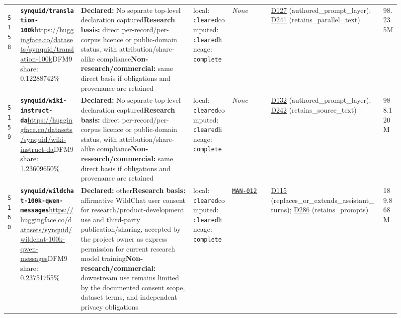\documentclass[9pt,a4paper]{article}
\newcommand{\srcid}[1]{\hypertarget{src:#1}{\texttt{#1}}}
\begin{document}
\begin{landscape}
\begin{longtable}{@{}L{0.03\linewidth}L{0.14\linewidth}L{0.26\linewidth}L{0.09\linewidth}L{0.09\linewidth}L{0.265\linewidth}L{0.045\linewidth}@{}}
\srcid{S158} & \textbf{\nolinkurl{synquid/translation-100k}}\newline \url{https://huggingface.co/datasets/synquid/translation-100k}\newline DFM9 share: 0.12288742\% & \textbf{Declared:} No separate top-level declaration captured\newline \textbf{Research basis:} direct per-record/per-corpus licence or public-domain status, with attribution/share-alike compliance\newline \textbf{Non-research/commercial:} same direct basis if obligations and provenance are retained & local: \texttt{cleared}\newline computed: \texttt{cleared}\newline lineage: \texttt{complete} & \textit{None} & \hyperlink{dep:D127}{D127} (authored\_prompt\_layer); \hyperlink{dep:D241}{D241} (retains\_parallel\_text) & 98.235M \\
\srcid{S159} & \textbf{\nolinkurl{synquid/wiki-instruct-da}}\newline \url{https://huggingface.co/datasets/synquid/wiki-instruct-da}\newline DFM9 share: 1.23609650\% & \textbf{Declared:} No separate top-level declaration captured\newline \textbf{Research basis:} direct per-record/per-corpus licence or public-domain status, with attribution/share-alike compliance\newline \textbf{Non-research/commercial:} same direct basis if obligations and provenance are retained & local: \texttt{cleared}\newline computed: \texttt{cleared}\newline lineage: \texttt{complete} & \textit{None} & \hyperlink{dep:D132}{D132} (authored\_prompt\_layer); \hyperlink{dep:D242}{D242} (retains\_source\_text) & 988.120M \\
\srcid{S160} & \textbf{\nolinkurl{synquid/wildchat-100k-qwen-messages}}\newline \url{https://huggingface.co/datasets/synquid/wildchat-100k-qwen-messages}\newline DFM9 share: 0.23751755\% & \textbf{Declared:} other\newline \textbf{Research basis:} affirmative WildChat user consent for research/product-development use and third-party publication/sharing, accepted by the project owner as express permission for current research model training\newline \textbf{Non-research/commercial:} downstream use remains limited by the documented consent scope, dataset terms, and independent privacy obligations & local: \texttt{cleared}\newline computed: \texttt{cleared}\newline lineage: \texttt{complete} & \hyperlink{manual:MAN-012}{\texttt{MAN-012}} & \hyperlink{dep:D115}{D115} (replaces\_or\_extends\_assistant\_turns); \hyperlink{dep:D286}{D286} (retains\_prompts) & 189.868M \\

\end{longtable}
\end{landscape}
\end{document}
